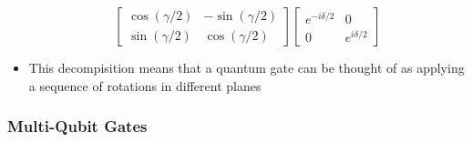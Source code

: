 \documentclass{article}
\begin{document}
\begin{itemize}
\begin{equation}
                    \begin{bmatrix}
                        \cos(\gamma /2) & - \sin(\gamma / 2) \\
                        \sin(\gamma / 2) & \cos(\gamma / 2)
                    \end{bmatrix}
                    \begin{bmatrix}
                        e^{-i \delta /2} & 0 \\
                        0               & e^{i \delta / 2}
                    \end{bmatrix} 
                \end{equation}
                \item This decompisition means that a quantum gate can be thought of as applying a sequence of rotations in different planes
            \end{itemize}

        \subsubsection{Multi-Qubit Gates}
\end{document}
